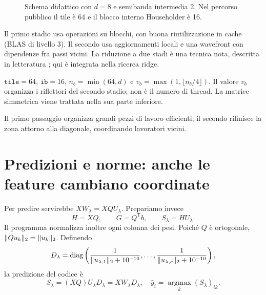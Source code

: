 \documentclass[11pt,a4paper]{article}
\newcommand{\semplice}[1]{\begin{idea}[title=In parole semplici]#1\end{idea}}
\DeclarePairedDelimiter{\norm}{\lVert}{\rVert}
\newcommand{\T}{\mathsf{T}}
\newcommand{\page}[1]{\clearpage\section{#1}}
\begin{document}
\begin{figure}[H]\centering
{}
\caption{Schema didattico con $d=8$ e semibanda intermedia 2. Nel percorso pubblico il tile è 64 e il blocco interno Householder è 16.}
\end{figure}
Il primo stadio usa operazioni su blocchi, con buona riutilizzazione in cache
(BLAS di livello 3). Il secondo usa aggiornamenti locali e una wavefront
con dipendenze fra passi vicini. La riduzione a due stadi è una tecnica nota,
descritta in letteratura \cite{twostage}; qui è integrata nella ricerca ridge.
\begin{idea}[title=I numeri del codice]
$\texttt{tile}=64$, $\texttt{ib}=16$, $n_b=\min(64,d)$ e
$v_b=\max(1,\lfloor n_b/4\rfloor)$. Il valore $v_b$ organizza i riflettori
del secondo stadio; non è il numero di thread. La matrice simmetrica viene
trattata nella sua parte inferiore.
\end{idea}
\semplice{Il primo passaggio organizza grandi pezzi di lavoro efficienti;
il secondo rifinisce la zona attorno alla diagonale, coordinando lavoratori vicini.}
\page{Predizioni e norme: anche le feature cambiano coordinate}
Per predire servirebbe $XW_\lambda=XQU_\lambda$. Prepariamo invece
\[
\boxed{H=XQ},\qquad \boxed{G=Q^{\T}b},\qquad
\boxed{S_\lambda=H U_\lambda}.
\]
Il programma normalizza inoltre ogni colonna dei pesi. Poiché $Q$ è
ortogonale, $\norm{Q u_k}_2=\norm{u_k}_2$. Definendo
\[
D_\lambda=\operatorname{diag}\left(
\frac{1}{\norm{u_{\lambda,1}}_2+10^{-10}},\ldots,
\frac{1}{\norm{u_{\lambda,c}}_2+10^{-10}}\right),
\]
la predizione del codice è
\[
\boxed{S_\lambda=(XQ)U_\lambda D_\lambda
             =XW_\lambda D_\lambda},\quad
\widehat y_i=\operatorname*{argmax}_{k} (S_\lambda)_{ik}.
\]
\end{document}
